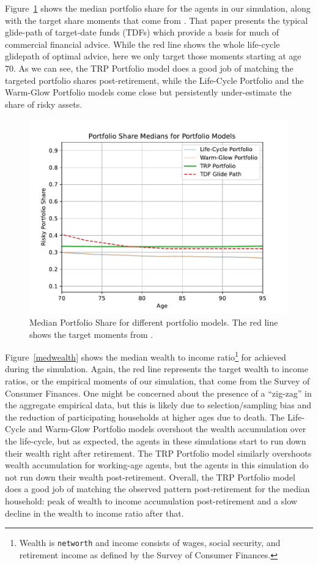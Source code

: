 \documentclass{article}
\begin{document}
Figure~\ref{medshare} shows the median portfolio share for the agents in our simulation, along with the target share moments that come from \cite{Aboagye2024}.
That paper presents the typical glide-path of target-date funds (TDFs) which provide a basis for much of commercial financial advice.
While the red line shows the whole life-cycle glidepath of optimal advice, here we only target those moments starting at age 70.
As we can see, the TRP Portfolio model does a good job of matching the targeted portfolio shares post-retirement, while the Life-Cycle Portfolio and the Warm-Glow Portfolio models come close but persistently under-estimate the share of risky assets.

\begin{figure}[!htbp]
\centering
\includegraphics[width=0.7\linewidth]{files/median_share-97dc90085c43f29226e26f2e405305d8.pdf}
\caption[]{Median Portfolio Share for different portfolio models. The red line shows the target moments from \cite{Aboagye2024}.}
\label{medshare}
\end{figure}

Figure~\ref{medwealth} shows the median wealth to income ratio\footnote{Wealth is \texttt{networth} and income consists of wages, social security, and retirement income as defined by the Survey of Consumer Finances.} for achieved during the simulation.
Again, the red line represents the target wealth to income ratios, or the empirical moments of our simulation, that come from the Survey of Consumer Finances.
One might be concerned about the presence of a ``zig-zag'' in the aggregate empirical data, but this is likely due to selection/sampling bias and the reduction of participating households at higher ages due to death.
The Life-Cycle and Warm-Glow Portfolio models overshoot the wealth accumulation over the life-cycle, but as expected, the agents in these simulations start to run down their wealth right after retirement.
The TRP Portfolio model similarly overshoots wealth accumulation for working-age agents, but the agents in this simulation do not run down their wealth post-retirement.
Overall, the TRP Portfolio model does a good job of matching the observed pattern post-retirement for the median household: peak of wealth to income accumulation post-retirement and a slow decline in the wealth to income ratio after that.
\end{document}
